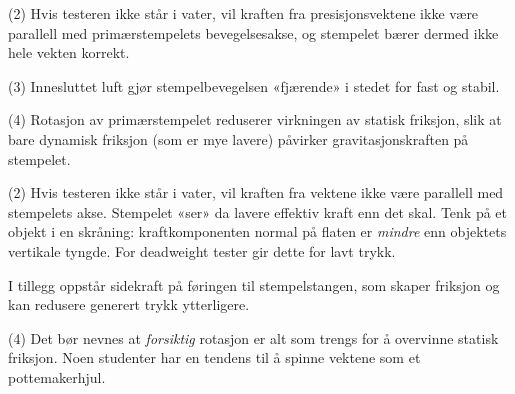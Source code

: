 \vskip 10pt {\narrower \noindent \baselineskip5pt

\noindent
(2) Hvis testeren ikke står i vater, vil kraften fra presisjonsvektene ikke være parallell med primærstempelets bevegelsesakse, og stempelet bærer dermed ikke hele vekten korrekt.

\par} \vskip 10pt




\vskip 10pt {\narrower \noindent \baselineskip5pt

\noindent
(3) Innesluttet luft gjør stempelbevegelsen «fjærende» i stedet for fast og stabil.

\par} \vskip 10pt




\vskip 10pt {\narrower \noindent \baselineskip5pt

\noindent
(4) Rotasjon av primærstempelet reduserer virkningen av statisk friksjon, slik at bare dynamisk friksjon (som er mye lavere) påvirker gravitasjonskraften på stempelet.

\par} \vskip 10pt










\vskip 10pt {\narrower \noindent \baselineskip5pt

\noindent
(2) Hvis testeren ikke står i vater, vil kraften fra vektene ikke være parallell med stempelets akse. Stempelet «ser» da lavere effektiv kraft enn det skal. Tenk på et objekt i en skråning: kraftkomponenten normal på flaten er {\it mindre} enn objektets vertikale tyngde. For deadweight tester gir dette for lavt trykk.

\vskip 10pt

\noindent
I tillegg oppstår sidekraft på føringen til stempelstangen, som skaper friksjon og kan redusere generert trykk ytterligere.

\par} \vskip 10pt





\vskip 10pt {\narrower \noindent \baselineskip5pt

\noindent
(4) Det bør nevnes at {\it forsiktig} rotasjon er alt som trengs for å overvinne statisk friksjon. Noen studenter har en tendens til å spinne vektene som et pottemakerhjul.

\par} \vskip 10pt


